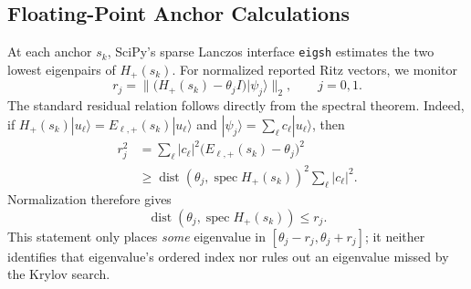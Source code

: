 \documentclass[11pt, a4paper]{article}
\newcommand{\ket}[1]{| #1 \rangle}
\newcommand{\norm}[1]{\| #1 \|}
\begin{document}
\subsection{Floating-Point Anchor Calculations}
At each anchor $s_k$, SciPy's sparse Lanczos interface \texttt{eigsh} estimates the two lowest eigenpairs of $H_+(s_k)$. For normalized reported Ritz vectors, we monitor
\begin{equation}
\label{eq:ritz-residual}
r_j=\norm{\bigl(H_+(s_k)-\theta_jI\bigr)\ket{\psi_j}}_2,
\qquad j=0,1.
\end{equation}
The standard residual relation follows directly from the spectral theorem. Indeed, if $H_+(s_k)\ket{u_\ell}=E_{\ell,+}(s_k)\ket{u_\ell}$ and $\ket{\psi_j}=\sum_\ell c_\ell\ket{u_\ell}$, then
\begin{equation}
\begin{aligned}
r_j^2
&=\sum_\ell |c_\ell|^2
\bigl(E_{\ell,+}(s_k)-\theta_j\bigr)^2\\
&\ge
\operatorname{dist}\!\left(\theta_j,
\operatorname{spec}H_+(s_k)\right)^2
\sum_\ell|c_\ell|^2.
\end{aligned}
\end{equation}
Normalization therefore gives
\begin{equation}
\operatorname{dist}\!\left(\theta_j,
\operatorname{spec}H_+(s_k)\right)\le r_j.
\end{equation}
This statement only places \emph{some} eigenvalue in $[\theta_j-r_j,\theta_j+r_j]$; it neither identifies that eigenvalue's ordered index nor rules out an eigenvalue missed by the Krylov search.
\end{document}
